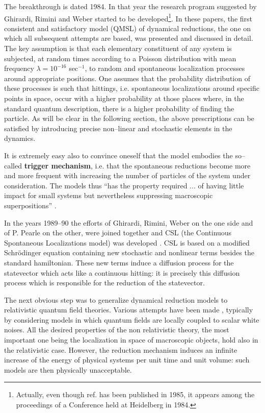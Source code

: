 \documentclass[12pt]{article}
\begin{document}
The breakthrough is dated 1984. In that year the research program
suggested by Ghirardi, Rimini and Weber \cite{heid,grw,grw2}
started to be developed\footnote{Actually, even though
ref.\cite{heid} has been published in 1985, it appears among the
proceedings of a Conference held at Heidelberg in 1984.}. In these
papers, the first consistent and satisfactory model (QMSL) of
dynamical reductions, the one on which all subsequent attempts are
based, was presented and discussed in detail. The key assumption
is that each elementary constituent of any system is subjected, at
random times according to a Poisson distribution with mean
frequency $\lambda = 10^{-16}$ sec$^{-1}$, to random and
spontaneous localization processes around appropriate positions.
One assumes that the probability distribution of these processes
is such that hittings, i.e. spontaneous localizations around
specific points in space, occur with a higher probability at those
places where, in the standard quantum description, there is a
higher probability of finding the particle. As will be clear in
the following section, the above prescriptions can be satisfied by
introducing precise non--linear and stochastic elements in the
dynamics.

It is extremely easy also to convince oneself that the model
embodies the so--called {\bf trigger mechanism}, i.e. that the
spontaneous reductions become more and more frequent with
increasing the number of particles of the system under
consideration. The models thus ``has the property required ... of
having little impact for small systems but nevertheless
suppressing macroscopic superpositions'' \cite{bellqg}.

In the years 1989--90 the efforts of Ghirardi, Rimini, Weber on
the one side and of P. Pearle on the other, were joined together
and CSL (the Continuous Spontaneous Localizations model) was
developed \cite{csl0,csl}. CSL is based on a modified
Schr\"odinger equation containing new stochastic and  nonlinear
terms besides the standard hamiltonian. These new terms induce a
diffusion process for the statevector which acts like a continuous
hitting: it is precisely this diffusion process which is
responsible for the reduction of the statevector.

The next obvious step was to generalize dynamical reduction models
to relativistic quantum field theories. Various attempts have been
made \cite{p62, rel}, typically by considering models in which quantum
fields are locally coupled to scalar white noises. All the desired
properties of the non relativistic theory, the most important one
being the localization in space of macroscopic objects, hold also
in the relativistic case. However, the reduction mechanism induces
an infinite increase of the energy of physical systems per unit
time and unit volume: such models are then physically
unacceptable.
\end{document}

